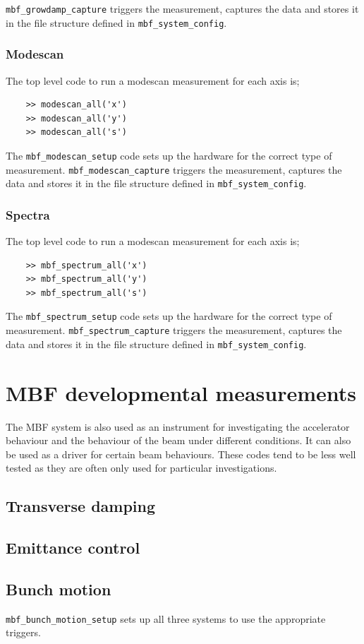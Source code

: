\documentclass{report}
\begin{document}
 \verb|mbf_growdamp_capture| triggers the measurement, captures the data and stores it in the file structure defined in \verb|mbf_system_config|. 
\subsubsection{Modescan}
The top level code to run a modescan measurement for each axis is; 
\begin{verbatim}
    >> modescan_all('x') 
    >> modescan_all('y') 
    >> modescan_all('s') 
\end{verbatim}

The \verb|mbf_modescan_setup| code sets up the hardware for the correct type of measurement. \verb|mbf_modescan_capture| triggers the measurement, captures the data and stores it in the file structure defined in \verb|mbf_system_config|. 
\subsubsection{Spectra}
The top level code to run a modescan measurement for each axis is; 
\begin{verbatim}
    >> mbf_spectrum_all('x') 
    >> mbf_spectrum_all('y') 
    >> mbf_spectrum_all('s') 
\end{verbatim}

The \verb|mbf_spectrum_setup| code sets up the hardware for the correct type of measurement. \verb|mbf_spectrum_capture| triggers the measurement, captures the data and stores it in the file structure defined in \verb|mbf_system_config|. 

\section{MBF developmental measurements}
The MBF system is also used as an instrument for investigating the accelerator behaviour and the behaviour of the beam under different conditions. It can also be used as a driver for certain beam behaviours. These codes tend to be less well tested as they are often only used for particular investigations.
\subsection{Transverse damping}
\subsection{Emittance control}
\subsection{Bunch motion}
 \verb|mbf_bunch_motion_setup| sets up all three systems to use the appropriate triggers. 
 
\end{document}
